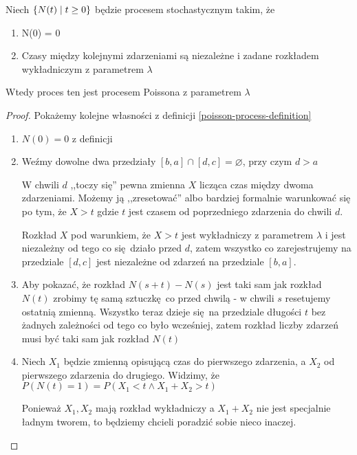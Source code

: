 \begin{theorem}[Twierdzenie 8.11 P\&C]
	Niech \(\set{N(t) \mid t \geq 0}\) będzie procesem stochastycznym takim, że
	\begin{enumerate}
		\item N(0) = 0
		\item Czasy między kolejnymi zdarzeniami są niezależne i zadane rozkładem wykładniczym
		      z parametrem \( \lambda \)
	\end{enumerate}
	Wtedy proces ten jest procesem Poissona z parametrem \( \lambda \)
\end{theorem}
\begin{proof}
	Pokażemy kolejne własności z definicji \ref{poisson-process-definition}

	\begin{enumerate}
		\item \( N(0) = 0 \) z definicji

		\item Weźmy dowolne dwa przedziały \( [b, a] \cap [d, c] = \varnothing \), przy czym \( d > a \)

		      W chwili \( d \) ,,toczy się'' pewna zmienna \( X \) licząca czas między dwoma zdarzeniami.
		      Możemy ją ,,zresetować'' albo bardziej formalnie warunkować się po tym, że \( X > t \) gdzie \( t \) jest czasem od poprzedniego zdarzenia do chwili \( d \).

		      Rozkład \( X \) pod warunkiem, że \( X > t \) jest wykładniczy z parametrem \( \lambda \) i jest niezależny od tego co się działo przed \( d \), zatem wszystko co zarejestrujemy na przedziale \( [d, c] \) jest niezależne od zdarzeń na przedziale \( [b, a] \).

		\item Aby pokazać, że rozkład \( N(s + t) - N(s) \) jest taki sam jak rozkład \( N(t) \) zrobimy tę samą sztuczkę co przed chwilą - w chwili \( s \) resetujemy ostatnią zmienną. Wszystko teraz dzieje się na przedziale długości \( t \) bez żadnych zależności od tego co było wcześniej, zatem rozkład liczby zdarzeń musi być taki sam jak rozkład \( N(t) \)

		\item Niech \( X_1 \) będzie zmienną opisującą czas do pierwszego zdarzenia, a \( X_2 \) od pierwszego zdarzenia do drugiego. Widzimy, że \( P(N(t) = 1) = P(X_1 < t \land X_1 + X_2 > t) \)

		      Ponieważ \( X_1, X_2 \) mają rozkład wykładniczy a \( X_1 + X_2 \) nie jest specjalnie ładnym tworem, to będziemy chcieli poradzić sobie nieco inaczej.


\end{enumerate}
\end{proof}
